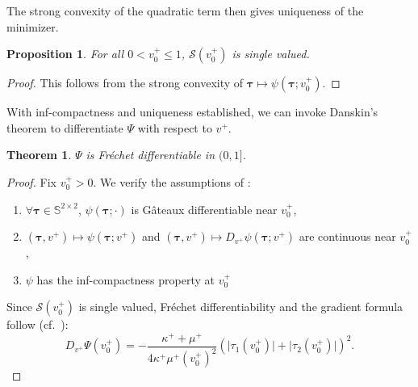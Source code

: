 \documentclass[preprint,3p]{elsarticle}
\newcommand{\tenss}[1]{\bm{\mathbf{#1}}}            %
\newtheorem{proposition}{Proposition}[section]
\newtheorem{theorem}{Theorem}[section]
\begin{document}
%
The strong convexity of the quadratic term then gives uniqueness of the minimizer.
%
 \begin{proposition}
     For all $0<v^+_0\leq 1$, $\mathcal{S}(v^+_0)$ is single valued.
 \end{proposition}
 \begin{proof}
     This follows from the strong convexity of $\tenss{\tau}\mapsto\psi(\tenss{\tau};v^+_0)$.
 \end{proof}
%
With inf-compactness and uniqueness established, we can invoke Danskin's theorem to differentiate $\Psi$ with respect to $v^+$.
%
	 \begin{theorem}
	     $\Psi$ is Fréchet differentiable in $(0,1]$.
	 \end{theorem}
	 \begin{proof}
     Fix $v^+_0>0$. We verify the assumptions of \citet[Theorem~4.13]{bonnans2013perturbation}:
     \begin{enumerate}
         \item $\forall\tenss{\tau}\in\mathbb{S}^{2\times 2}$, $\psi(\tenss{\tau};\cdot)$ is Gâteaux differentiable near $v^+_0$,
         \item $(\tenss{\tau},v^+)\mapsto\psi(\tenss{\tau};v^+)$ and $(\tenss{\tau},v^+)\mapsto D_{v^+}\psi(\tenss{\tau};v^+)$ are continuous near $v^+_0$,
         \item $\psi$ has the inf-compactness property at $v^+_0$
     \end{enumerate}
     Since $\mathcal{S}(v^+_0)$ is single valued, Fréchet differentiability and the gradient formula follow (cf.\ \citep[Remark~4.14]{bonnans2013perturbation}):
     \begin{equation}
         D_{v^+}\Psi(v^+_0)=-\frac{\kappa^++\mu^+}{4\kappa^+\mu^+(v^+_0)^2}(\lvert\tau_1(v^+_0)\rvert+\lvert\tau_2(v^+_0)\rvert)^2.
     \end{equation} 
 \end{proof}
 
\end{document}
